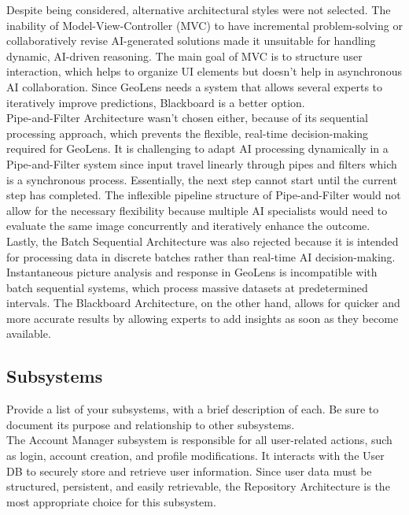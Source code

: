 \documentclass[]{article}
\begin{document}
\noindent Despite being considered, alternative architectural styles were not selected. The inability of Model-View-Controller (MVC) to have incremental problem-solving or collaboratively revise AI-generated solutions made it unsuitable for handling dynamic, AI-driven reasoning. The main goal of MVC is to structure user interaction, which helps to organize UI elements but doesn't help in asynchronous AI collaboration. Since GeoLens needs a system that allows several experts to iteratively improve predictions, Blackboard is a better option.\\

\noindent Pipe-and-Filter Architecture wasn't chosen either, because of its sequential processing approach, which prevents the flexible, real-time decision-making required for GeoLens. It is challenging to adapt AI processing dynamically in a Pipe-and-Filter system since input travel linearly through pipes and filters which is a synchronous process. Essentially, the next step cannot start until the current step has completed. The inflexible pipeline structure of Pipe-and-Filter would not allow for the necessary flexibility because multiple AI specialists would need to evaluate the same image concurrently and iteratively enhance the outcome.\\

\noindent Lastly, the Batch Sequential Architecture was also rejected because it is intended for processing data in discrete batches rather than real-time AI decision-making. Instantaneous picture analysis and response in GeoLens is incompatible with batch sequential systems, which process massive datasets at predetermined intervals. The Blackboard Architecture, on the other hand, allows for quicker and more accurate results by allowing experts to add insights as soon as they become available.\\


\subsection{Subsystems}
\label{sub:subsystems}
 \noindent Provide a list of your subsystems, with a brief description of each. Be sure to document its purpose and relationship to other subsystems.\\

 \noindent The Account Manager subsystem is responsible for all user-related actions, such as login, account creation, and profile modifications. It interacts with the User DB to securely store and retrieve user information. Since user data must be structured, persistent, and easily retrievable, the Repository Architecture is the most appropriate choice for this subsystem. \\
\end{document}
